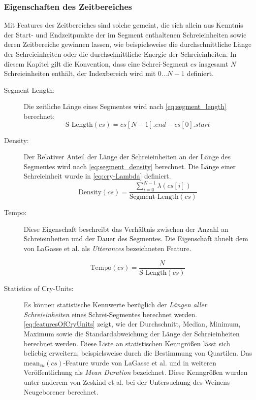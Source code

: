 \subsubsection{Eigenschaften des Zeitbereiches}

Mit Features des Zeitbereiches sind solche gemeint, die sich allein aus Kenntnis der Start- und Endzeitpunkte der im Segment enthaltenen Schreieinheiten sowie deren Zeitbereiche gewinnen lassen, wie beispielsweise die durchschnittliche Länge der Schreieinheiten oder die durchschnittliche Energie der Schreieinheiten.\cite[S. 16 - 17]{cry_thesis} In diesem Kapitel gilt die Konvention, dass eine Schrei-Segment $cs$ insgesamt $N$ Schreieinheiten enthält, der Indexbereich wird mit $0 \ldots N-1$ definiert.

\begin{description}
\item[Segment-Length: ] Die zeitliche Länge eines Segmentes wird nach \autoref{eq:segment_length} berechnet:
\begin{equation}
\text{S-Length}(cs) = cs[N-1].end - cs[0].start
\label{eq:segment_length}
\end{equation}

\item[Density: ] Der Relativer Anteil der Länge der Schreieinheiten an der Länge des Segmentes wird nach \autoref{eq:segment_density} berechnet. Die Länge einer Schreieinheit wurde in \autoref{eq:cry-Lambda} definiert.
\begin{equation}
\text{Density}(cs) = \frac{\sum_{i = 0}^{N-1} \lambda(cs[i])}{\text{Segment-Length}(cs)}
\label{eq:segment_density}
\end{equation}

\item[Tempo:] Diese Eigenschaft beschreibt das Verhältnis zwischen der Anzahl an Schreieinheiten und der Dauer des Segmentes. Die Eigenschaft ähnelt dem von LaGasse et al. \cite[S. 85]{parentalPerception} als \emph{Utterances} bezeichneten Feature.

\begin{equation}
\text{Tempo}(cs) =  \frac{N}{\text{S-Length}(cs)}
\end{equation}

\item[Statistics of Cry-Units:] Es können statistische Kennwerte bezüglich der \emph{Längen aller Schreieinheiten} eines Schrei-Segmentes berechnet werden. \autoref{eq:featuresOfCryUnits} zeigt, wie der Durchschnitt, Median, Minimum, Maximum sowie die Standardabweichung der Länge der Schreieinheiten berechnet werden. Diese Liste an statistischen Kenngrößen lässt sich beliebig erweitern, beispielsweise durch die Bestimmung von Quartilen. Das $\text{mean}_{cu}(cs)$-Feature wurde von LaGasse et al. \cite[S. 85]{parentalPerception} und in weiteren Veröffentlichung als \emph{Mean Duration} bezeichnet. Diese Kenngrößen wurden unter anderem von Zeskind et al. \cite{rythmic} bei der Untersuchung des Weinens Neugeborener berechnet.


\end{description}
